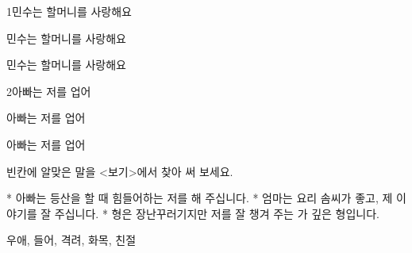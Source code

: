 \documentclass[fs13,seriesSau]{korfarm-base}
\begin{document}
\kfActivityBg \par{}
\par{}\par\nopagebreak[4]\smallskip\nopagebreak[4]
\begin{kfSentenceUnit}{1}{민수는 할머니를 사랑해요}
\begin{kfChoices}
\kfChoice 민수는
\kfChoice 할머니를
\kfChoice 사랑해요
\end{kfChoices}
\begin{kfChoices}
\kfChoice 민수는
\kfChoice 할머니를
\kfChoice 사랑해요
\end{kfChoices}
\end{kfSentenceUnit}

\begin{kfSentenceUnit}{2}{아빠는 저를 업어}
\begin{kfChoices}
\kfChoice 아빠는
\kfChoice 저를
\kfChoice 업어
\end{kfChoices}
\begin{kfChoices}
\kfChoice 아빠는
\kfChoice 저를
\kfChoice 업어
\end{kfChoices}
\end{kfSentenceUnit}

\kfActivityBg \par{}\par\nopagebreak[4]\smallskip\nopagebreak[4]
\begin{kfBlankList}
\kfBlankItem 빈칸에 알맞은 말을 <보기>에서 찾아 써 보세요.

* 아빠는 등산을 할 때 힘들어하는 저를 \kfFillBlank[42mm]{}해 주십니다. * 엄마는 요리 솜씨가 좋고, 제 이야기를 잘 \kfFillBlank[42mm]{} 주십니다. * 형은 장난꾸러기지만 저를 잘 챙겨 주는 \kfFillBlank[42mm]{}가 깊은 형입니다.
\begin{kfEvidence}우애, 들어, 격려, 화목, 친절\end{kfEvidence}
\end{kfBlankList}

\kfActivityBg \par{}\par\nopagebreak[4]\smallskip\nopagebreak[4]
\end{document}
